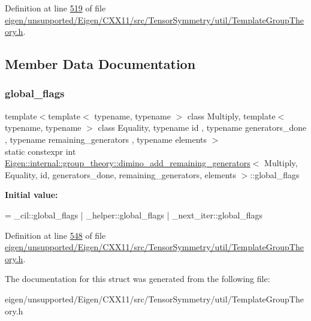 Definition at line \hyperlink{eigen_2unsupported_2_eigen_2_c_x_x11_2src_2_tensor_symmetry_2util_2_template_group_theory_8h_source_l00519}{519} of file \hyperlink{eigen_2unsupported_2_eigen_2_c_x_x11_2src_2_tensor_symmetry_2util_2_template_group_theory_8h_source}{eigen/unsupported/\+Eigen/\+C\+X\+X11/src/\+Tensor\+Symmetry/util/\+Template\+Group\+Theory.\+h}.



\subsection{Member Data Documentation}
\mbox{\label{struct_eigen_1_1internal_1_1group__theory_1_1dimino__add__remaining__generators_aa348a5c41c0980da2832c054e49e6a93}} 
\subsubsection{\texorpdfstring{global\+\_\+flags}{global\_flags}}
{\footnotesize\ttfamily template$<$template$<$ typename, typename $>$ class Multiply, template$<$ typename, typename $>$ class Equality, typename id , typename generators\+\_\+done , typename remaining\+\_\+generators , typename elements $>$ \\
static constexpr int \hyperlink{struct_eigen_1_1internal_1_1group__theory_1_1dimino__add__remaining__generators}{Eigen\+::internal\+::group\+\_\+theory\+::dimino\+\_\+add\+\_\+remaining\+\_\+generators}$<$ Multiply, Equality, id, generators\+\_\+done, remaining\+\_\+generators, elements $>$\+::global\+\_\+flags\hspace{0.3cm}{\ttfamily [static]}}

{\bfseries Initial value\+:}
\begin{DoxyCode}
=
    \_cil::global\_flags |
    \_helper::global\_flags |
    \_next\_iter::global\_flags
\end{DoxyCode}


Definition at line \hyperlink{eigen_2unsupported_2_eigen_2_c_x_x11_2src_2_tensor_symmetry_2util_2_template_group_theory_8h_source_l00548}{548} of file \hyperlink{eigen_2unsupported_2_eigen_2_c_x_x11_2src_2_tensor_symmetry_2util_2_template_group_theory_8h_source}{eigen/unsupported/\+Eigen/\+C\+X\+X11/src/\+Tensor\+Symmetry/util/\+Template\+Group\+Theory.\+h}.



The documentation for this struct was generated from the following file\+:\begin{DoxyCompactItemize}
\item 
eigen/unsupported/\+Eigen/\+C\+X\+X11/src/\+Tensor\+Symmetry/util/\+Template\+Group\+Theory.\+h\end{DoxyCompactItemize}
